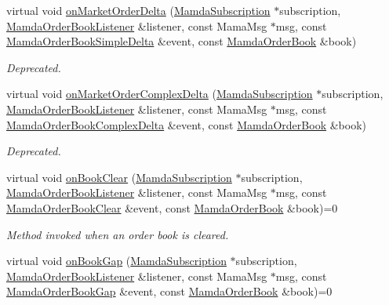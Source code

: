 \begin{CompactItemize}
virtual void \hyperlink{classWombat_1_1MamdaOrderBookHandler_f62d90cce9788330e3b0e42d22e72d05}{on\-Market\-Order\-Delta} (\hyperlink{classWombat_1_1MamdaSubscription}{Mamda\-Subscription} $\ast$subscription, \hyperlink{classWombat_1_1MamdaOrderBookListener}{Mamda\-Order\-Book\-Listener} \&listener, const Mama\-Msg $\ast$msg, const \hyperlink{classWombat_1_1MamdaOrderBookSimpleDelta}{Mamda\-Order\-Book\-Simple\-Delta} \&event, const \hyperlink{classWombat_1_1MamdaOrderBook}{Mamda\-Order\-Book} \&book)
\begin{CompactList}\small\item\em Deprecated. \item\end{CompactList}\item 
virtual void \hyperlink{classWombat_1_1MamdaOrderBookHandler_27f1cb6978ef96b94fed8f612906b65a}{on\-Market\-Order\-Complex\-Delta} (\hyperlink{classWombat_1_1MamdaSubscription}{Mamda\-Subscription} $\ast$subscription, \hyperlink{classWombat_1_1MamdaOrderBookListener}{Mamda\-Order\-Book\-Listener} \&listener, const Mama\-Msg $\ast$msg, const \hyperlink{classWombat_1_1MamdaOrderBookComplexDelta}{Mamda\-Order\-Book\-Complex\-Delta} \&event, const \hyperlink{classWombat_1_1MamdaOrderBook}{Mamda\-Order\-Book} \&book)
\begin{CompactList}\small\item\em Deprecated. \item\end{CompactList}\item 
virtual void \hyperlink{classWombat_1_1MamdaOrderBookHandler_2035c156ec11491cb9b7af92a592f278}{on\-Book\-Clear} (\hyperlink{classWombat_1_1MamdaSubscription}{Mamda\-Subscription} $\ast$subscription, \hyperlink{classWombat_1_1MamdaOrderBookListener}{Mamda\-Order\-Book\-Listener} \&listener, const Mama\-Msg $\ast$msg, const \hyperlink{classWombat_1_1MamdaOrderBookClear}{Mamda\-Order\-Book\-Clear} \&event, const \hyperlink{classWombat_1_1MamdaOrderBook}{Mamda\-Order\-Book} \&book)=0
\begin{CompactList}\small\item\em Method invoked when an order book is cleared. \item\end{CompactList}\item 
virtual void \hyperlink{classWombat_1_1MamdaOrderBookHandler_54d949ce0ddfe085be5c6112a5682cec}{on\-Book\-Gap} (\hyperlink{classWombat_1_1MamdaSubscription}{Mamda\-Subscription} $\ast$subscription, \hyperlink{classWombat_1_1MamdaOrderBookListener}{Mamda\-Order\-Book\-Listener} \&listener, const Mama\-Msg $\ast$msg, const \hyperlink{classWombat_1_1MamdaOrderBookGap}{Mamda\-Order\-Book\-Gap} \&event, const \hyperlink{classWombat_1_1MamdaOrderBook}{Mamda\-Order\-Book} \&book)=0

\end{CompactItemize}
